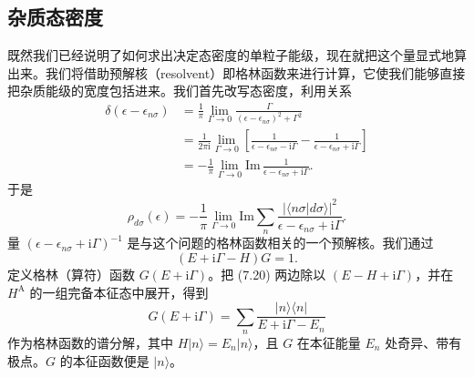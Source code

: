 \subsection{杂质态密度}

既然我们已经说明了如何求出决定态密度的单粒子能级，现在就把这个量显式地算出来。我们将借助预解核（resolvent）即格林函数来进行计算，它使我们能够直接把杂质能级的宽度包括进来。我们首先改写态密度，利用关系
\begin{equation*}
\begin{aligned}
\delta(\epsilon-\epsilon_{n\sigma})&=\frac{1}{\pi}\lim_{\Gamma\to 0}\frac{\Gamma}{(\epsilon-\epsilon_{n\sigma})^{2}+\Gamma^{2}}\\
&=\frac{1}{2\pi\mathrm{i}}\lim_{\Gamma\to 0}\left[\frac{1}{\epsilon-\epsilon_{n\sigma}-\mathrm{i}\Gamma}-\frac{1}{\epsilon-\epsilon_{n\sigma}+\mathrm{i}\Gamma}\right]\\
&=-\frac{1}{\pi}\lim_{\Gamma\to 0}\mathrm{Im}\,\frac{1}{\epsilon-\epsilon_{n\sigma}+\mathrm{i}\Gamma}.
\end{aligned}\tag{7.18}
\end{equation*}
于是
\begin{equation*}
\rho_{d\sigma}(\epsilon)=-\frac{1}{\pi}\lim_{\Gamma\to 0}\mathrm{Im}\sum_{n}\frac{|\langle n\sigma|d\sigma\rangle|^{2}}{\epsilon-\epsilon_{n\sigma}+\mathrm{i}\Gamma}.\tag{7.19}
\end{equation*}
量 $(\epsilon-\epsilon_{n\sigma}+\mathrm{i}\Gamma)^{-1}$ 是与这个问题的格林函数相关的一个预解核。我们通过
\begin{equation*}
(E+\mathrm{i}\Gamma-H)G=1.\tag{7.20}
\end{equation*}
定义格林（算符）函数 $G(E+\mathrm{i}\Gamma)$。把 (7.20) 两边除以 $(E-H+\mathrm{i}\Gamma)$，并在 $H^{\mathrm{A}}$ 的一组完备本征态中展开，得到
\begin{equation*}
G(E+\mathrm{i}\Gamma)=\sum_{n}\frac{|n\rangle\langle n|}{E+\mathrm{i}\Gamma-E_{n}}\tag{7.21}
\end{equation*}
作为格林函数的谱分解，其中 $H|n\rangle=E_{n}|n\rangle$，且 $G$ 在本征能量 $E_{n}$ 处奇异、带有极点。$G$ 的本征函数便是 $|n\rangle$。

